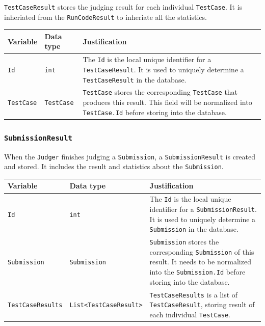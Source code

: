 \documentclass[a4paper]{report}
\begin{document}
\texttt{TestCaseResult} stores the judging result for each individual \texttt{TestCase}. It is inheriated from the \texttt{RunCodeResult} to inheriate all the statistics.

\begin{tabulary}{\textwidth}{|l|l|L|}
    \hline
    Variable & Data type & Justification \\
    \hline
    \texttt{Id} & \texttt{int} & The \texttt{Id} is the local unique identifier for a \texttt{TestCaseResult}. It is used to uniquely determine a \texttt{TestCaseResult} in the database. \\
    \hline
    \texttt{TestCase} & \texttt{TestCase} & \texttt{TestCase} stores the corresponding \texttt{TestCase} that produces this result. This field will be normalized into \texttt{TestCase.Id} before storing into the database. \\
    \hline
\end{tabulary}

\subsubsection{\texttt{SubmissionResult}}

When the \texttt{Judger} finishes judging a \texttt{Submission}, a \texttt{SubmissionResult} is created and stored. It includes the result and statistics about the \texttt{Submission}.

\begin{tabulary}{\textwidth}{|l|l|L|}
    \hline
    Variable & Data type & Justification \\
    \hline
    \texttt{Id} & \texttt{int} & The \texttt{Id} is the local unique identifier for a \texttt{SubmissionResult}. It is used to uniquely determine a \texttt{Submission} in the database.\\
    \hline
    \texttt{Submission} & \texttt{Submission} & \texttt{Submission} stores the corresponding \texttt{Submission} of this result. It needs to be normalized into the \texttt{Submission.Id} before storing into the database. \\
    \hline
    \texttt{TestCaseResults} & \texttt{List<TestCaseResult>} & \texttt{TestCaseResults} is a list of \texttt{TestCaseResult}, storing result of each individual \texttt{TestCase}. \\
    \hline
 \end{tabulary}
\end{document}
